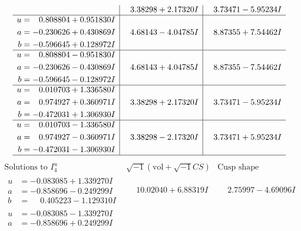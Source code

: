 \documentclass[1p]{elsarticle_modified}
\theoremstyle{definition}
\newcommand{\I}{\sqrt{-1}}
\begin{document}
$$\begin{array}{c|c|c}
 & \phantom{-}3.38298 + 2.17320 I & \phantom{-}3.73471 - 5.95234 I \\ \hline\begin{aligned}
u &= \phantom{-}0.808804 + 0.951830 I \\
a &= -0.230626 + 0.430869 I \\
b &= -0.596645 + 0.128972 I\end{aligned}
 & \phantom{-}4.68143 - 4.04785 I & \phantom{-}8.87355 + 7.54462 I \\ \hline\begin{aligned}
u &= \phantom{-}0.808804 - 0.951830 I \\
a &= -0.230626 - 0.430869 I \\
b &= -0.596645 - 0.128972 I\end{aligned}
 & \phantom{-}4.68143 + 4.04785 I & \phantom{-}8.87355 - 7.54462 I \\ \hline\begin{aligned}
u &= \phantom{-}0.010703 + 1.336580 I \\
a &= \phantom{-}0.974927 + 0.360971 I \\
b &= -0.472031 + 1.306930 I\end{aligned}
 & \phantom{-}3.38298 + 2.17320 I & \phantom{-}3.73471 - 5.95234 I \\ \hline\begin{aligned}
u &= \phantom{-}0.010703 - 1.336580 I \\
a &= \phantom{-}0.974927 - 0.360971 I \\
b &= -0.472031 - 1.306930 I\end{aligned}
 & \phantom{-}3.38298 - 2.17320 I & \phantom{-}3.73471 + 5.95234 I\\
 \hline 
 \end{array}$$\newpage$$\begin{array}{c|c|c}  
\text{Solutions to }I^u_{4}& \I (\text{vol} + \sqrt{-1}CS) & \text{Cusp shape}\\
 \hline 
\begin{aligned}
u &= -0.083085 + 1.339270 I \\
a &= -0.858696 - 0.249299 I \\
b &= \phantom{-}0.405223 - 1.129310 I\end{aligned}
 & \phantom{-}10.02040 + 6.88319 I & \phantom{-}2.75997 - 4.69096 I \\ \hline\begin{aligned}
u &= -0.083085 - 1.339270 I \\
a &= -0.858696 + 0.249299 I \\

\end{aligned}
\end{array}$$
\end{document}
